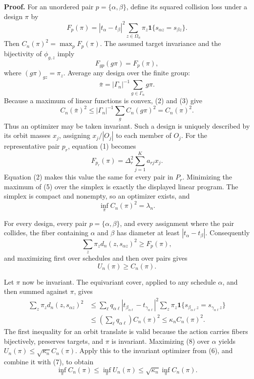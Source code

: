 \textbf{Proof.}
For an unordered pair \(p=\{\alpha,\beta\}\), define its squared collision loss under a design \(\pi\) by
\[
 F_p(\pi)=|t_\alpha-t_\beta|^2
 \sum_{z\in\Omega_n}\pi_z
 \mathbf 1\{s_{\alpha z}=s_{\beta z}\}. \tag{1}
\]
Then \(C_n(\pi)^2=\max_pF_p(\pi)\). The assumed target invariance and the bijectivity of \(\phi_{g,z}\) imply
\[
 F_{gp}(g\pi)=F_p(\pi), \tag{2}
\]
where \((g\pi)_{gz}=\pi_z\). Average any design over the finite group:
\[
 \bar\pi=|\Gamma_n|^{-1}\sum_{g\in\Gamma_n}g\pi. \tag{3}
\]
Because a maximum of linear functions is convex, (2) and (3) give
\[
 C_n(\bar\pi)^2
 \le |\Gamma_n|^{-1}\sum_g C_n(g\pi)^2
 =C_n(\pi)^2. \tag{4}
\]
Thus an optimizer may be taken invariant. Such a design is uniquely described by its orbit masses \(x_j\), assigning \(x_j/|O_j|\) to each member of \(O_j\). For the representative pair \(p_r\), equation (1) becomes
\[
 F_{p_r}(\pi)=\Delta_r^2\sum_{j=1}^K a_{rj}x_j. \tag{5}
\]
Equation (2) makes this value the same for every pair in \(P_r\). Minimizing the maximum of (5) over the simplex is exactly the displayed linear program. The simplex is compact and nonempty, so an optimizer exists, and
\[
 \inf_\pi C_n(\pi)^2=\lambda_n. \tag{6}
\]

For every design, every pair \(p=\{\alpha,\beta\}\), and every assignment where the pair collides, the fiber containing \(\alpha\) and \(\beta\) has diameter at least \(|t_\alpha-t_\beta|\). Consequently
\[
 \sum_z\pi_zd_n(z,s_{\alpha z})^2\ge F_p(\pi),
\]
and maximizing first over schedules and then over pairs gives
\[
 U_n(\pi)\ge C_n(\pi). \tag{7}
\]

Let \(\pi\) now be invariant. The equivariant cover, applied to any schedule \(\alpha\), and then summed against \(\pi\), gives
\[
 \begin{aligned}
 \sum_z\pi_zd_n(z,s_{\alpha z})^2
 &\le \sum_\ell q_{\alpha\ell}
 |t_{\beta_{\alpha\ell}}-t_{\gamma_{\alpha\ell}}|^2
 \sum_z\pi_z\mathbf 1\{s_{\beta_{\alpha\ell}z}=s_{\gamma_{\alpha\ell}z}\}\\
 &\le \left(\sum_\ell q_{\alpha\ell}\right)C_n(\pi)^2
 \le\kappa_n C_n(\pi)^2. \tag{8}
 \end{aligned}
\]
The first inequality for an orbit translate is valid because the action carries fibers bijectively, preserves targets, and \(\pi\) is invariant. Maximizing (8) over \(\alpha\) yields \(U_n(\pi)\le\sqrt{\kappa_n}C_n(\pi)\). Apply this to the invariant optimizer from (6), and combine it with (7), to obtain
\[
 \inf_\pi C_n(\pi)
 \le\inf_\pi U_n(\pi)
 \le\sqrt{\kappa_n}\inf_\pi C_n(\pi). \tag{9}
\]

